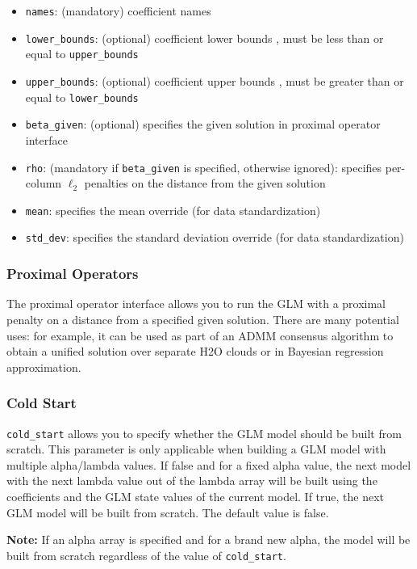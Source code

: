 \begin{itemize}
\item \texttt{names}: (mandatory) coefficient names
\item \texttt{lower\_bounds}: (optional) coefficient lower bounds , must be less than or equal to \texttt{upper\_bounds}
\item \texttt{upper\_bounds}: (optional) coefficient upper bounds , must be greater than or equal to \texttt{lower\_bounds}
\item \texttt{beta\_given}: (optional) specifies the given solution in proximal operator interface
\item \texttt{rho}: (mandatory if \texttt{beta\_given} is specified, otherwise ignored): specifies per-column  $\ell_2$ penalties on the distance from the given solution
\item \texttt{mean}: specifies the mean override (for data standardization)
\item \texttt{std\_dev}: specifies the standard deviation override (for data standardization)
\end{itemize}
 
\subsubsection{Proximal Operators}

The proximal operator interface allows you to run the GLM with a proximal penalty on a distance from a specified
given solution. There are many potential uses: for example, it can be used as part of an ADMM consensus algorithm
to obtain a unified solution over separate H2O clouds or in Bayesian regression approximation.

\subsubsection{Cold Start}
\texttt{cold\_start} allows you to specify whether the GLM model should be built from scratch. This parameter is only applicable when building a GLM model with multiple alpha/lambda values. If false and for a fixed alpha value, the next model with the next lambda value out of the lambda array will be built using the coefficients and the GLM state values of the current model. If true, the next GLM model will be built from scratch. The default value is false.

\textbf{Note:} If an alpha array is specified and for a brand new alpha, the model will be built from scratch regardless of the value of \texttt{cold\_start}.


